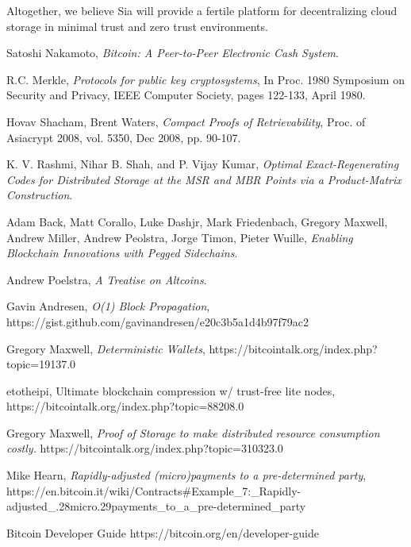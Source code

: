 \documentclass[twocolumn]{article}
\begin{document}
Altogether, we believe Sia will provide a fertile platform for decentralizing cloud storage in minimal trust and zero trust environments.

\onecolumn
\begin{thebibliography}{9}

	Satoshi Nakamoto,
	\emph{Bitcoin: A Peer-to-Peer Electronic Cash System}.

	R.C. Merkle,
	\emph{Protocols for public key cryptosystems},
	In Proc. 1980 Symposium on Security and	Privacy,
	IEEE Computer Society, pages 122-133, April 1980.

	Hovav Shacham, Brent Waters,
	\emph{Compact Proofs of Retrievability},
	Proc. of Asiacrypt 2008, vol. 5350, Dec 2008, pp. 90-107.

	K. V. Rashmi, Nihar B. Shah, and P. Vijay Kumar,
	\emph{Optimal Exact-Regenerating Codes for Distributed Storage at the MSR and MBR Points via a Product-Matrix Construction}.

	Adam Back, Matt Corallo, Luke Dashjr, Mark Friedenbach, Gregory Maxwell, Andrew Miller, Andrew Peolstra, Jorge Timon, Pieter Wuille,
	\emph{Enabling Blockchain Innovations with Pegged Sidechains}.

	Andrew Poelstra,
	\emph{A Treatise on Altcoins}.

	Gavin Andresen,
	\emph{O(1) Block Propagation},
	https://gist.github.com/gavinandresen/e20c3b5a1d4b97f79ac2

	Gregory Maxwell,
	\emph{Deterministic Wallets},
	https://bitcointalk.org/index.php?topic=19137.0

	etotheipi,
	Ultimate blockchain compression w/ trust-free lite nodes, \newline
	https://bitcointalk.org/index.php?topic=88208.0

	Gregory Maxwell,
	\emph{Proof of Storage to make distributed resource consumption costly.}
	https://bitcointalk.org/index.php?topic=310323.0

	Mike Hearn,
	\emph{Rapidly-adjusted (micro)payments to a pre-determined party},\newline
	https://en.bitcoin.it/wiki/Contracts\#Example\_7:\_Rapidly-adjusted\_.28micro.29payments\_to\_a\_pre-determined\_party

	Bitcoin Developer Guide
	https://bitcoin.org/en/developer-guide


\end{thebibliography}
\end{document}
